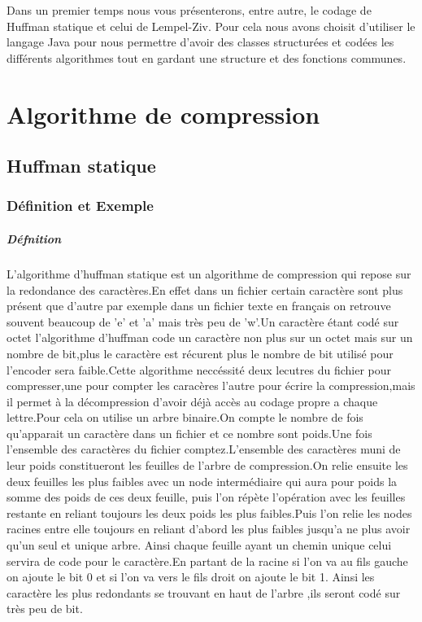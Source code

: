 \documentclass{report}
\begin{document}
Dans un premier temps nous vous présenterons, entre autre, le codage de Huffman statique et celui de Lempel-Ziv. 
Pour cela nous avons choisit d'utiliser le langage Java pour nous permettre d'avoir des classes structurées et codées les différents algorithmes tout en gardant une structure et des fonctions communes.
 \part*{Algorithme de compression}
\chapter*{Huffman statique}
\section*{Définition et Exemple }
\subsubsection*{Défnition}
L'algorithme d'huffman statique est un algorithme de compression qui repose sur la redondance des caractères.En effet dans un fichier certain caractère sont plus présent que d'autre par exemple dans un fichier texte en français on retrouve souvent beaucoup de 'e' et 'a' mais très peu de 'w'.Un caractère étant codé sur octet l'algorithme d'huffman code un caractère non plus sur un octet mais sur un nombre de bit,plus le caractère est récurent plus le nombre de bit utilisé pour l'encoder sera faible.Cette algorithme neccéssité deux lecutres du fichier pour compresser,une pour compter les caracères l'autre pour écrire la compression,mais il permet à la décompression d'avoir déjà accès au codage propre a chaque lettre.Pour cela on utilise un arbre binaire.On compte le nombre de fois qu'apparait un caractère dans un fichier et ce nombre sont poids.Une fois l'ensemble des caractères du fichier comptez.L'ensemble des caractères muni de leur poids constitueront les feuilles de l'arbre de compression.On relie ensuite les deux feuilles les plus faibles avec un node intermédiaire qui aura pour poids la somme des poids de ces deux feuille, puis l'on répète l'opération avec les feuilles restante en reliant toujours les deux poids les plus faibles.Puis l'on relie les nodes racines entre elle toujours en reliant d'abord les plus faibles jusqu'a ne plus avoir qu'un seul et unique arbre. Ainsi chaque feuille ayant un chemin unique celui servira de code pour le caractère.En partant de la racine si l'on va au fils gauche on ajoute le bit 0 et si l'on va vers le fils droit on ajoute le bit 1. Ainsi les caractère les plus redondants se trouvant en haut de l'arbre ,ils seront codé sur très peu de bit.
\end{document}
